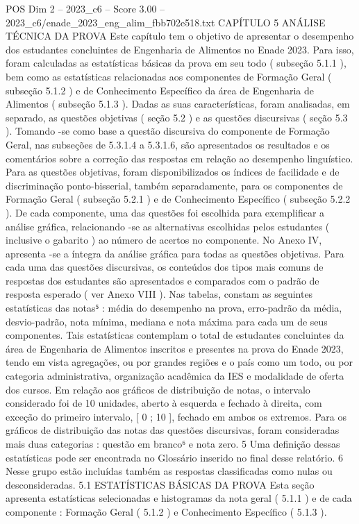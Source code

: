 \begin{textsample}{POS Dim 2 – 2023\_c6 – Score 3.00 – 2023\_c6/enade\_2023\_eng\_alim\_fbb702e518.txt}  \label{ex:f2_pos_161}
CAPÍTULO 5 ANÁLISE TÉCNICA DA PROVA Este capítulo tem o objetivo de apresentar o desempenho dos estudantes concluintes de Engenharia de Alimentos no Enade 2023.
Para isso, foram calculadas as estatísticas básicas da prova em seu todo ( subseção 5.1.1 ), bem como as estatísticas relacionadas aos componentes de Formação Geral ( subseção 5.1.2 ) e de Conhecimento Específico da área de Engenharia de Alimentos ( subseção 5.1.3 ).
Dadas as suas características, foram analisadas, em separado, as questões objetivas ( seção 5.2 ) e as questões discursivas ( seção 5.3 ).
Tomando -se como base a questão discursiva do componente de Formação Geral, nas subseções de 5.3.1.4 a 5.3.1.6, são apresentados os resultados e os comentários sobre a correção das respostas em relação ao desempenho linguístico.
Para as questões objetivas, foram disponibilizados os índices de facilidade e de discriminação ponto-bisserial, também separadamente, para os componentes de Formação Geral ( subseção 5.2.1 ) e de Conhecimento Específico ( subseção 5.2.2 ).
De cada componente, uma das questões foi escolhida para exemplificar a análise gráfica, relacionando -se as alternativas escolhidas pelos estudantes ( inclusive o gabarito ) ao número de acertos no componente.
No Anexo IV, apresenta -se a íntegra da análise gráfica para todas as questões objetivas.
Para cada uma das questões discursivas, os conteúdos dos tipos mais comuns de respostas dos estudantes são apresentados e comparados com o padrão de resposta esperado ( ver Anexo VIII ).
Nas tabelas, constam as seguintes estatísticas das notas⁵ : média do desempenho na prova, erro-padrão da média, desvio-padrão, nota mínima, mediana e nota máxima para cada um de seus componentes.
Tais estatísticas contemplam o total de estudantes concluintes da área de Engenharia de Alimentos inscritos e presentes na prova do Enade 2023, tendo em vista agregações, ou por grandes regiões e o país como um todo, ou por categoria administrativa, organização acadêmica da IES e modalidade de oferta dos cursos.
Em relação aos gráficos de distribuição de notas, o intervalo considerado foi de 10 unidades, aberto à esquerda e fechado à direita, com exceção do primeiro intervalo, [ 0 ; 10 ], fechado em ambos os extremos.
Para os gráficos de distribuição das notas das questões discursivas, foram consideradas mais duas categorias : questão em branco⁶ e nota zero. 5 Uma definição dessas estatísticas pode ser encontrada no Glossário inserido no final desse relatório. 6 Nesse grupo estão incluídas também as respostas classificadas como nulas ou desconsideradas. 5.1 ESTATÍSTICAS BÁSICAS DA PROVA Esta seção apresenta estatísticas selecionadas e histogramas da nota geral ( 5.1.1 ) e de cada componente : Formação Geral ( 5.1.2 ) e Conhecimento Específico ( 5.1.3 ).

\end{textsample}
